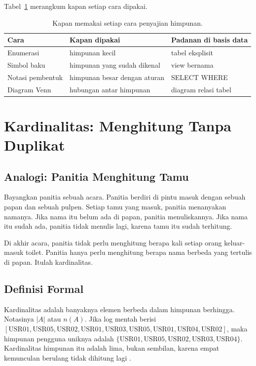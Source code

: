 \documentclass[11pt,a4paper]{article}
\begin{document}
Tabel~\ref{tab:penyajian} merangkum kapan setiap cara dipakai.

\begin{table}[H]
	\centering
	\caption{Kapan memakai setiap cara penyajian himpunan.}
	\label{tab:penyajian}
	\small
	\begin{tabularx}{\textwidth}{l X X}
		\toprule
		Cara & Kapan dipakai & Padanan di basis data \\
		\midrule
		Enumerasi & himpunan kecil & tabel eksplisit \\
		Simbol baku & himpunan yang sudah dikenal & view bernama \\
		Notasi pembentuk & himpunan besar dengan aturan & SELECT WHERE \\
		Diagram Venn & hubungan antar himpunan & diagram relasi tabel \\
		\bottomrule
	\end{tabularx}
\end{table}

\section{Kardinalitas: Menghitung Tanpa Duplikat}

\subsection{Analogi: Panitia Menghitung Tamu}

Bayangkan panitia sebuah acara. Panitia berdiri di pintu masuk dengan sebuah papan dan sebuah pulpen. Setiap tamu yang masuk, panitia menanyakan namanya. Jika nama itu belum ada di papan, panitia menuliskannya. Jika nama itu sudah ada, panitia tidak menulis lagi, karena tamu itu sudah terhitung.

Di akhir acara, panitia tidak perlu menghitung berapa kali setiap orang keluar-masuk toilet. Panitia hanya perlu menghitung berapa nama berbeda yang tertulis di papan. Itulah kardinalitas.

\subsection{Definisi Formal}

Kardinalitas adalah banyaknya elemen berbeda dalam himpunan berhingga. Notasinya $|A|$ atau $n(A)$. Jika log mentah berisi $[\text{USR01},\text{USR05},\text{USR02},\text{USR01},\text{USR03},\text{USR05},\text{USR01},\text{USR04},\text{USR02}]$, maka himpunan pengguna uniknya adalah $\{\text{USR01},\text{USR05},\text{USR02},\text{USR03},\text{USR04}\}$. Kardinalitas himpunan itu adalah lima, bukan sembilan, karena empat kemunculan berulang tidak dihitung lagi \cite{rosen}.
\end{document}
